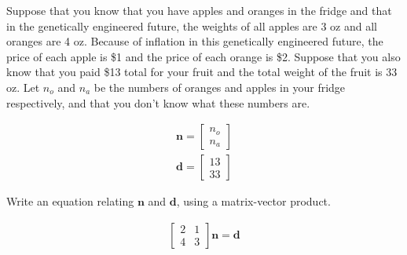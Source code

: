 Suppose that you know that you have apples and oranges in the fridge and that in the genetically engineered future, the weights of all apples are 3 oz and all oranges are 4 oz. Because of inflation in this genetically engineered future, the price of each apple is \$1 and the price of each orange is \$2. Suppose that you also know that you paid \$13 total for your fruit and the total weight of the fruit is 33 oz. Let $n_o$ and $n_a$ be the numbers of oranges and apples in your fridge respectively, and that you don’t know what these numbers are.

\begin{align*}
    \boldsymbol{n} = \begin{bmatrix}
        n_o \\ n_a
    \end{bmatrix} \\
    \boldsymbol{d} = \begin{bmatrix}
        13 \\ 33
    \end{bmatrix}
\end{align*}

Write an equation relating $\boldsymbol{n}$ and $\boldsymbol{d}$, using a matrix-vector product.

\begin{solution}
    \begin{align*}
        \begin{bmatrix}
            2 & 1 \\
        4 & 3
        \end{bmatrix}\boldsymbol{n} = \boldsymbol{d}
    \end{align*}
\end{solution}